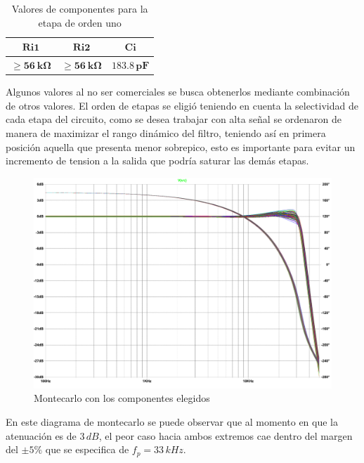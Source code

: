 \documentclass[11pt, a4paper]{article}
\begin{document}
\begin{table}[H]
\centering
\begin{tabular}{|c|c|c|}
\hline
$\mathbf{Ri1}$ & $\mathbf{Ri2}$ & $\mathbf{Ci}$     \\ \hline
$\mathbf{\geq \SI{56}{k\ohm}}$ & $\mathbf{\geq \SI{56}{k\ohm}}$ & $\mathbf{183.8 \,pF}$ \\ \hline
\end{tabular}
\caption{Valores de componentes para la etapa de orden uno}
\label{tabla:legendreetapaorden1}
\end{table}
	Algunos valores al no ser comerciales se busca obtenerlos mediante combinación de otros valores.
	El orden de etapas se eligió teniendo en cuenta la selectividad de cada etapa del circuito, como se desea trabajar con alta señal se ordenaron de manera de maximizar el rango dinámico del filtro, teniendo así en primera posición aquella que presenta menor sobrepico, esto es importante para evitar un incremento de tension a la salida que podría saturar las demás etapas.
\begin{figure}[H]
	\centering
	\includegraphics[scale=0.5]{montecarlolegendre.pdf}
	\caption{Montecarlo con los componentes elegidos}
	\label{fig:montecarlolegendre}
\end{figure}
	En este diagrama de montecarlo se puede observar que al momento en que la atenuación es de $3 \, dB$, el peor caso hacia ambos extremos cae dentro del margen del $\pm 5 \%$ que se especifica de $f_p = 33 \, kHz$.
\end{document}

